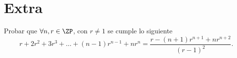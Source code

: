 \section{Extra}

\begin{section-problem}
    Probar que $\forall n, r \in \ZP$, con $r \neq 1$ se cumple lo siguiente
    \[r + 2 r^2 + 3 r^3 + \dots + (n - 1) r^{n - 1} + n r^n = \frac{r - (n + 1)r^{n + 1} + nr^{n + 2}}{(r - 1)^2}.\]
\end{section-problem}